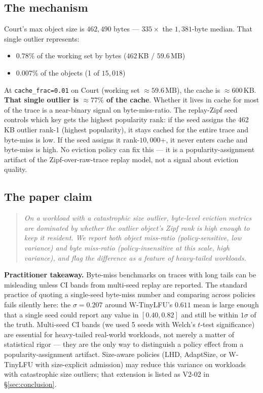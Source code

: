 \subsection{The mechanism}

Court's max object size is $462{,}490$ bytes --- $335\times$ the $1{,}381$-byte
median. That single outlier represents:
\begin{itemize}\setlength{\itemsep}{0pt}
  \item $0.78\%$ of the working set by bytes ($462$\,KB / $59.6$\,MB)
  \item $0.007\%$ of the objects (1 of $15{,}018$)
\end{itemize}

At \texttt{cache\_frac=0.01} on Court (working set $\approx 59.6$\,MB), the
cache is $\approx 600$\,KB. \textbf{That single outlier is $\approx 77\%$ of
the cache}. Whether it lives in cache for most of the trace is a near-binary
signal on byte-miss-ratio. The replay-Zipf seed controls which key gets the
highest popularity rank: if the seed assigns the 462\,KB outlier rank-1
(highest popularity), it stays cached for the entire trace and byte-miss is
low. If the seed assigns it rank-$10{,}000$+, it never enters cache and
byte-miss is high. No eviction policy can fix this --- it is a
popularity-assignment artifact of the Zipf-over-raw-trace replay model, not a
signal about eviction quality.

\subsection{The paper claim}

\begin{quote}\itshape\small
On a workload with a catastrophic size outlier, byte-level eviction metrics
are dominated by whether the outlier object's Zipf rank is high enough to
keep it resident. We report both object miss-ratio (policy-sensitive, low
variance) and byte miss-ratio (policy-insensitive at this scale, high
variance), and flag the difference as a feature of heavy-tailed workloads.
\end{quote}

\textbf{Practitioner takeaway.} Byte-miss benchmarks on traces with long
tails can be misleading unless CI bands from multi-seed replay are reported.
The standard practice of quoting a single-seed byte-miss number and comparing
across policies fails silently here: the $\sigma = 0.207$ around W-TinyLFU's
$0.611$ mean is large enough that a single seed could report any value in
$[0.40, 0.82]$ and still be within $1\sigma$ of the truth. Multi-seed CI
bands (we used 5 seeds with Welch's $t$-test significance) are essential for
heavy-tailed real-world workloads, not merely a matter of statistical rigor
--- they are the only way to distinguish a policy effect from a
popularity-assignment artifact. Size-aware policies (LHD, AdaptSize, or
W-TinyLFU with size-explicit admission) may reduce this variance on workloads
with catastrophic size outliers; that extension is listed as V2-02 in
\S\ref{sec:conclusion}.
